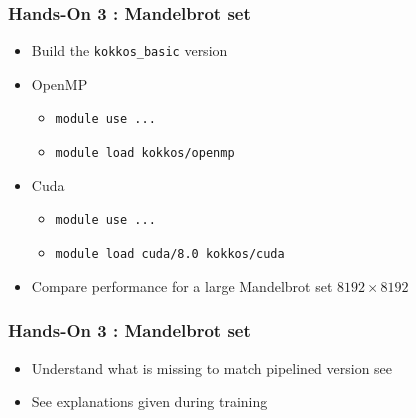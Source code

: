 \begin{frame}[fragile=singleslide]
  \frametitle{Hands-On 3 : Mandelbrot set}

  \begin{itemize}
  \item Build the \texttt{kokkos\_basic} version
  \item OpenMP
    \begin{itemize}
    \item \texttt{module use ...}
    \item \texttt{module load kokkos/openmp}
    \end{itemize}
  \item Cuda
    \begin{itemize}
    \item \texttt{module use ...}
    \item \texttt{module load cuda/8.0 kokkos/cuda}
    \end{itemize}
  \item Compare performance for a large Mandelbrot set $8192\times 8192$
  \end{itemize}

\end{frame}
  
\begin{frame}[fragile=singleslide]
  \frametitle{Hands-On 3 : Mandelbrot set}

  \begin{itemize}
  \item Understand what is missing to match pipelined version see
  \item See explanations given during training
  \end{itemize}

\end{frame}